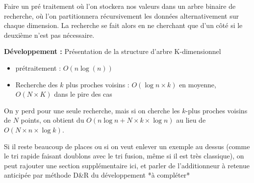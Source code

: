 \begin{algo}[Solution D\&R]
	Faire un pré traitement où l'on stockera nos valeurs dans un arbre binaire de recherche, où l'on partitionnera récursivement les données alternativement sur chaque dimension. La recherche se fait alors en ne cherchant que d'un côté si le deuxième n'est pas nécessaire.
\end{algo}

\textbf{Développement :} Présentation de la structure d'arbre K-dimensionnel

\begin{proposition}[Complexité]\enspace
	\begin{itemize}
		\item prétraitement : $O(n \log(n))$
		\item Recherche des $k$ plus proches voisins : $O(\log n \times k)$ en moyenne, $O(N \times K)$ dans le pire des cas
	\end{itemize}
\end{proposition}


\begin{rem}
	On y perd pour une seule recherche, mais si on cherche les $k$-plus proches voisins de $N$ points, on obtient du $O(n \log n + N \times k \times \log n)$ au lieu de $O(N \times n \times \log k)$.
\end{rem}

\begin{com}
	Si il reste beaucoup de places ou si on veut enlever un exemple au dessus (comme le tri rapide faisant doublons avec le tri fusion, même si il est très classique), on peut rajouter une section supplémentaire ici, et parler de l'additionneur à retenue anticipée par méthode D\&R du développement *à compléter*
\end{com}